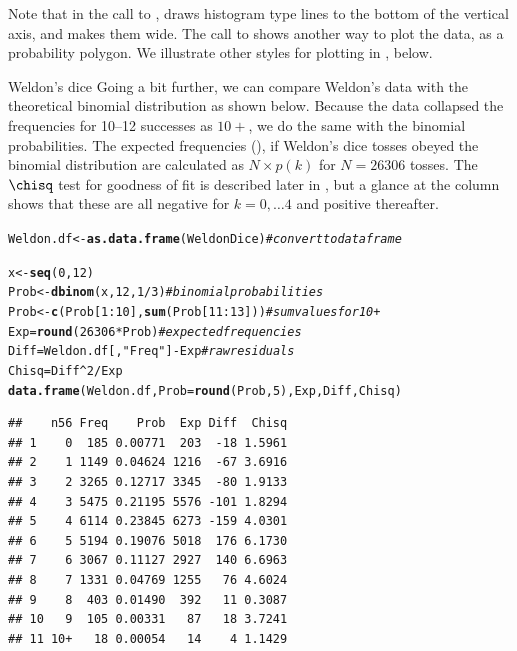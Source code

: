 \documentclass[11pt]{book}\usepackage[]{graphicx}\usepackage[]{color}
\makeatletter
\newcommand{\hlnum}[1]{\textcolor[rgb]{0.686,0.059,0.569}{#1}}%
\newcommand{\hlstr}[1]{\textcolor[rgb]{0.192,0.494,0.8}{#1}}%
\newcommand{\hlcom}[1]{\textcolor[rgb]{0.678,0.584,0.686}{\textit{#1}}}%
\newcommand{\hlopt}[1]{\textcolor[rgb]{0,0,0}{#1}}%
\newcommand{\hlstd}[1]{\textcolor[rgb]{0.345,0.345,0.345}{#1}}%
\newcommand{\hlkwb}[1]{\textcolor[rgb]{0.69,0.353,0.396}{#1}}%
\newcommand{\hlkwc}[1]{\textcolor[rgb]{0.333,0.667,0.333}{#1}}%
\newcommand{\hlkwd}[1]{\textcolor[rgb]{0.737,0.353,0.396}{\textbf{#1}}}%
\newenvironment{kframe}{%
 \def\at@end@of@kframe{}%
 \ifinner\ifhmode%
  \def\at@end@of@kframe{\end{minipage}}%
  \begin{minipage}{\columnwidth}%
 \fi\fi%
 \def\FrameCommand##1{\hskip\@totalleftmargin \hskip-\fboxsep
 \colorbox{shadecolor}{##1}\hskip-\fboxsep
     \hskip-\linewidth \hskip-\@totalleftmargin \hskip\columnwidth}%
 \MakeFramed {\advance\hsize-\width
   \@totalleftmargin\z@ \linewidth\hsize
   \@setminipage}}%
 {\par\unskip\endMakeFramed%
 \at@end@of@kframe}
\newenvironment{knitrout}{}{} %
\renewenvironment{knitrout}{\small\renewcommand{\baselinestretch}{.85}}{} %
\makeatother
\begin{document}
Note that in the call to ,  draws histogram type
lines to the bottom of the vertical axis, and  makes them wide.
The call to  shows another way to plot the data, as a probability
polygon. We illustrate other styles for plotting in ,
 below.

\begin{Example}[dice2]{Weldon's dice}
Going a bit further, we can compare Weldon's data with the 
theoretical binomial distribution as shown below. Because the
 data collapsed the frequencies for 10--12
successes as $10+$,
we do the same with the binomial probabilities.
The expected frequencies (), if Weldon's dice tosses obeyed
the binomial distribution are calculated as $N \times p(k)$ for
$N=26306$ tosses.  The $\chisq$ test for goodness of fit
is described later in , but a glance
at the  column shows that these are all negative for
$k=0, \dots 4$ and positive thereafter.

\begin{knitrout}
\color{fgcolor}\begin{kframe}
\begin{alltt}
\hlstd{Weldon.df} \hlkwb{<-} \hlkwd{as.data.frame}\hlstd{(WeldonDice)}   \hlcom{# convert to data frame}

\hlstd{x} \hlkwb{<-} \hlkwd{seq}\hlstd{(}\hlnum{0}\hlstd{,} \hlnum{12}\hlstd{)}
\hlstd{Prob} \hlkwb{<-} \hlkwd{dbinom}\hlstd{(x,} \hlnum{12}\hlstd{,} \hlnum{1}\hlopt{/}\hlnum{3}\hlstd{)}               \hlcom{# binomial probabilities}
\hlstd{Prob} \hlkwb{<-} \hlkwd{c}\hlstd{(Prob[}\hlnum{1}\hlopt{:}\hlnum{10}\hlstd{],} \hlkwd{sum}\hlstd{(Prob[}\hlnum{11}\hlopt{:}\hlnum{13}\hlstd{]))}  \hlcom{# sum values for 10+}
\hlstd{Exp}\hlkwb{=} \hlkwd{round}\hlstd{(}\hlnum{26306}\hlopt{*}\hlstd{Prob)}                   \hlcom{# expected frequencies}
\hlstd{Diff} \hlkwb{=} \hlstd{Weldon.df[,}\hlstr{"Freq"}\hlstd{]} \hlopt{-} \hlstd{Exp}          \hlcom{# raw residuals}
\hlstd{Chisq} \hlkwb{=} \hlstd{Diff}\hlopt{^}\hlnum{2} \hlopt{/}\hlstd{Exp}
\hlkwd{data.frame}\hlstd{(Weldon.df,} \hlkwc{Prob}\hlstd{=}\hlkwd{round}\hlstd{(Prob,}\hlnum{5}\hlstd{), Exp, Diff, Chisq)}
\end{alltt}
\begin{verbatim}
##    n56 Freq    Prob  Exp Diff  Chisq
## 1    0  185 0.00771  203  -18 1.5961
## 2    1 1149 0.04624 1216  -67 3.6916
## 3    2 3265 0.12717 3345  -80 1.9133
## 4    3 5475 0.21195 5576 -101 1.8294
## 5    4 6114 0.23845 6273 -159 4.0301
## 6    5 5194 0.19076 5018  176 6.1730
## 7    6 3067 0.11127 2927  140 6.6963
## 8    7 1331 0.04769 1255   76 4.6024
## 9    8  403 0.01490  392   11 0.3087
## 10   9  105 0.00331   87   18 3.7241
## 11 10+   18 0.00054   14    4 1.1429
\end{verbatim}
\end{kframe}
\end{knitrout}

\end{Example}
\end{document}
